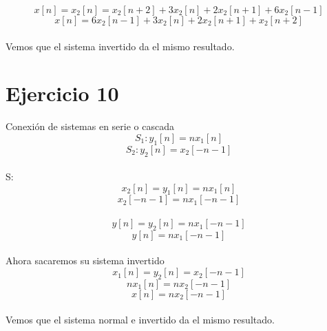 \documentclass[10pt,a4paper]{report}
\begin{document}
\[
x\left [ n \right ]=x_{2}\left [ n \right ]=x_{2}\left [ n+2 \right ]+3x_{2}\left [ n \right ]+2x_{2}\left [ n+1 \right ]+6x_{2}\left [ n-1 \right ]
\]
\[
x\left [ n \right ]=6x_{2}\left [ n-1 \right ]+3x_{2}\left [ n \right ]+2x_{2}\left [ n+1 \right ]+x_{2}\left [ n+2 \right ]
\]\\

Vemos que el sistema invertido da el mismo resultado.

\section{Ejercicio 10}

Conexión de sistemas en serie o cascada\\

\[
S_{1}: y_{1}\left [ n \right ]=nx_{1}\left [ n \right ]
\]
\[
S_{2}: y_{2}\left [ n \right ]=x_{2}\left [ -n-1 \right ]
\]\\

S:\\

\[
x_{2}\left [ n \right ]=y_{1}\left [ n \right ]=nx_{1}\left [ n \right ]
\]
\[
x_{2}\left [ -n-1 \right ]=nx_{1}\left [ -n-1 \right ]
\]\\

\[
y\left [ n \right ]=y_{2}\left [ n \right ]=nx_{1}\left [ -n-1 \right ]
\]
\[
y\left [ n \right ]=nx_{1}\left [ -n-1 \right ]
\]\\

Ahora sacaremos su sistema invertido\\
\[
x_{1}\left [ n \right ]=y_{2}\left [ n \right ]=x_{2}\left [ -n-1 \right ]
\]
\[
nx_{1}\left [ n \right ]=nx_{2}\left [ -n-1 \right ]
\]
\[
x\left [ n \right ]=nx_{2}\left [ -n-1 \right ]
\]\\

Vemos que el sistema normal e invertido da el mismo resultado.
\end{document}

